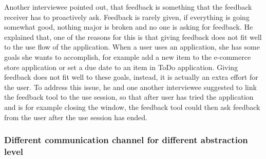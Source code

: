 \documentclass[english,12pt,a4paper,pdftex]{article}
\begin{document}
Another interviewee pointed out, that feedback is something that the feedback receiver has to proactively ask. Feedback is rarely given, if everything is going somewhat good, nothing major is broken and no one is asking for feedback. He explained that, one of the reasons for this is that giving feedback does not fit well to the use flow of the application. When a user uses an application, she has some goals she wants to accomplish, for example add a new item to the e-commerce store application or set a due date to an item in ToDo application. Giving feedback does not fit well to these goals, instead, it is actually an extra effort for the user. To address this issue, he and one another interviewee suggested to link the feedback tool to the use session, so that after user has tried the application and is for example closing the window, the feedback tool could then ask feedback from the user after the use session has ended.

\subsubsection{Different communication channel for different abstraction level}

\end{document}
